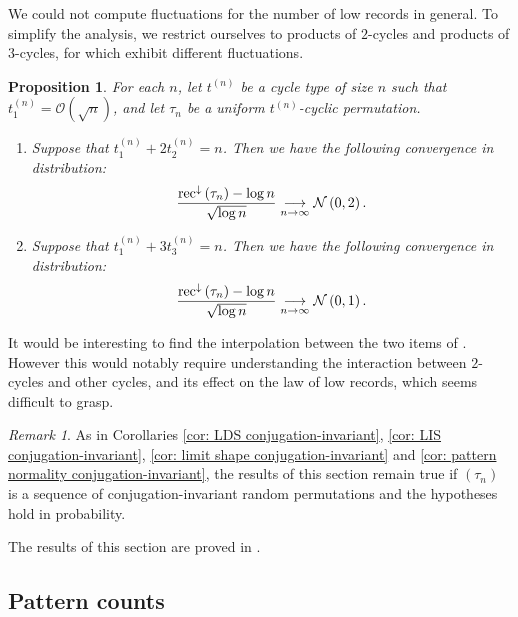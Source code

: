 \documentclass{article}
\newtheorem{prop}[theorem]{Proposition}
\theoremstyle{remark}
\newtheorem{rem}{Remark}
\newcommand{\cv}[2]{\underset{#1\to#2}{\longrightarrow}}
\def\O{\mathcal{O}}
\newcommand{\Normal}[2]{{\cal N}\left(#1 , #2\right)}
\newcommand{\lrec}[1]{\mathrm{rec}^\downarrow\left(#1\right)}
\begin{document}
We could not compute fluctuations for the number of low records in general.
To simplify the analysis, we restrict ourselves to products of $2$-cycles and products of $3$-cycles, for which exhibit different fluctuations.

\begin{prop}\label{prop: low records fluctuations}
    For each $n$, let $t^{(n)}$ be a cycle type of size $n$ such that $t_1^{(n)}=\O\left(\sqrt n\right)$, and let $\tau_n$ be a uniform $t^{(n)}$-cyclic permutation.
    \begin{enumerate}
        \item Suppose that $t_1^{(n)}+2t_2^{(n)}=n$.
        Then we have the following convergence in distribution:
        \begin{equation*}
            \frac{\lrec{\tau_n}-\log n}{\sqrt{\log n}}
            \cv{n}{\infty} \Normal{0}{2} .
        \end{equation*}
        \item Suppose that $t_1^{(n)}+3t_3^{(n)}=n$.
        Then we have the following convergence in distribution:
        \begin{equation*}
            \frac{\lrec{\tau_n}-\log n}{\sqrt{\log n}}
            \cv{n}{\infty} \Normal{0}{1} .
        \end{equation*}
    \end{enumerate}
\end{prop}

It would be interesting to find the interpolation between the two items of .
However this would notably require understanding the interaction between $2$-cycles and other cycles, and its effect on the law of low records, which seems difficult to grasp.

\begin{rem}
    As in Corollaries \ref{cor: LDS conjugation-invariant}, \ref{cor: LIS conjugation-invariant}, \ref{cor: limit shape conjugation-invariant} and \ref{cor: pattern normality conjugation-invariant}, the results of this section remain true if $(\tau_n)$ is a sequence of conjugation-invariant random permutations and the hypotheses hold in probability.
\end{rem}

The results of this section are proved in .


\subsection{Pattern counts}
\label{sec: results pattern}
\end{document}
